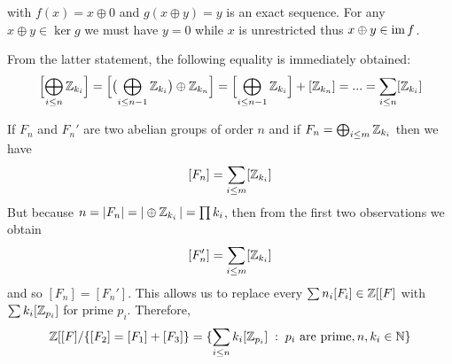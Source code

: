 with $f(x)=x\oplus 0$ and $g(x\oplus y)=y$ is an exact sequence. For any $x\oplus y\in\ker g$ we must have $y=0$ while $x$ is unrestricted thus $x\oplus y\in \operatorname{im} f$.

From the latter statement, the following equality is immediately obtained:
\begin{align*}
  \Bigl[\bigoplus_{i\leq n}\operatorname{\mathbb{Z}}_{k_i}\Bigr]=\Bigl[\bigl(\bigoplus_{i\leq n-1} \operatorname{\mathbb{Z}}_{k_i}\bigr)\oplus \operatorname{\mathbb{Z}}_{k_n}\Bigr]=\Bigl[\bigoplus_{i\leq n-1}\operatorname{\mathbb{Z}}_{k_i}\Bigr]+[\operatorname{\mathbb{Z}}_{k_n}]=...=\sum_{i\leq n}[\operatorname{\mathbb{Z}}_{k_i}]
\end{align*}

If $F_n$ and $F_n'$ are two abelian groups of order $n$ and if $F_n=\bigoplus_{i\leq m}\operatorname{\mathbb{Z}}_{k_i}$ then we have
$$[F_n]=\sum_{i\leq m} [\operatorname{\mathbb{Z}}_{k_i}]$$
But because $n=|F_n|=|\oplus \operatorname{\mathbb{Z}}_{k_i}|=\prod k_i$, then from the first two observations we obtain
$$[F_n']=\sum_{i\leq m} [\operatorname{\mathbb{Z}}_{k_i}]$$
and so $[F_n]=[F_n']$. This allows us to replace every $\sum n_i[F_i]\in\operatorname{\mathbb{Z}}[[F]$ with $\sum k_i[\operatorname{\mathbb{Z}}_{p_i}]$ for prime $p_i$. Therefore,
$$\operatorname{\mathbb{Z}}[[F]/\{[F_2]=[F_1]+[F_3]\}=\{\sum_{i\leq n} k_i[\operatorname{\mathbb{Z}}_{p_i}]\;:\;p_i\text{ are prime}, n,k_i\in\operatorname{\mathbb{N}}\}$$
